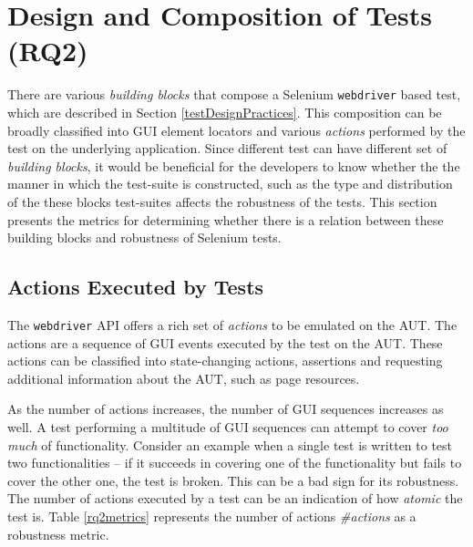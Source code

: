\section{Design and Composition of Tests (RQ2)}
\label{robfactors}
There are various \textit{building blocks} that compose a Selenium \texttt{webdriver} based test, which are described in Section \ref{testDesignPractices}. This composition can be broadly classified into GUI element locators and various \textit{actions} performed by the test on the underlying application. Since different test can have different set of \textit{building blocks}, it would be beneficial for the developers to know whether the the manner in which the test-suite is constructed, such as the type and distribution of the these blocks test-suites affects the robustness of the tests. This section presents the metrics for determining whether there is a relation between these building blocks and robustness of Selenium tests.  

\subsection{Actions Executed by Tests}
\label{test-actions}
The \texttt{webdriver} API offers a rich set of \textit{actions} to be emulated on the AUT. The actions are a sequence of GUI events executed by the test on the AUT. These actions can be classified into state-changing actions, assertions and requesting additional information about the AUT, such as page resources. 

As the number of actions increases, the number of GUI sequences increases as well. A test performing a multitude of GUI sequences can attempt to cover \textit{too much} of functionality. Consider an example when a single test is written to test two functionalities -- if it succeeds in covering one of the functionality but fails to cover the other one, the test is broken. This can be a bad sign for its robustness. 
The number of actions executed by a test can be an indication of how \textit{atomic} the test is. Table \ref{rq2metrics} represents the number of actions \textit{\#actions} as a robustness metric. 

